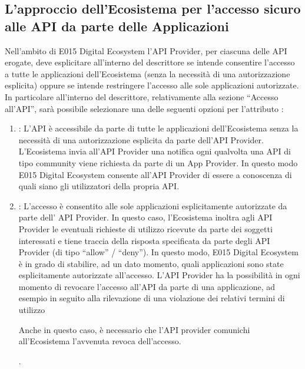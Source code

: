 \documentclass[letterpaper,10pt,italian]{sphinxmanual}
\begin{document}
\subsection{L’approccio dell’Ecosistema per l’accesso sicuro alle API da parte delle Applicazioni}
\label{\detokenize{sez22:sezione222}}\label{\detokenize{sez22:lapproccio-dellecosistema-per-laccesso-sicuro-alle-api-da-parte-delle-applicazioni}}
Nell’ambito di E015 Digital Ecosystem l’API Provider, per ciascuna delle API erogate, deve esplicitare all’interno del descrittore se intende consentire l’accesso a tutte le applicazioni dell’Ecosistema (senza la necessità di una autorizzazione esplicita) oppure se intende restringere l’accesso alle sole applicazioni autorizzate.
In particolare all’interno del descrittore, relativamente alla sezione “Accesso all’API”, sarà possibile selezionare una delle seguenti opzioni per l’attributo :
\begin{enumerate}
\item {} 
: L’API è accessibile da parte di tutte le applicazioni dell’Ecosistema senza la necessità di una autorizzazione esplicita da parte dell’API Provider. L’Ecosistema invia all’API Provider una notifica ogni qualvolta una API di tipo community viene richiesta da parte di un App Provider. In questo modo E015 Digital Ecosystem consente all’API Provider di essere a conoscenza di quali siano gli utilizzatori della propria API.

\item {} 
: L’accesso è consentito alle sole applicazioni esplicitamente autorizzate da parte dell’ API Provider. In questo caso, l’Ecosistema inoltra agli API Provider le eventuali richieste di utilizzo ricevute da parte dei soggetti interessati e tiene traccia della risposta specificata da parte degli API Provider (di tipo “allow” / “deny”). In questo modo, E015 Digital Ecosystem è in grado di stabilire, ad un dato momento, quali applicazioni sono state esplicitamente autorizzate all’accesso. L’API Provider ha la possibilità in ogni momento di revocare l’accesso all’API da parte di una applicazione, ad esempio in seguito alla rilevazione di una violazione dei relativi termini di utilizzo %
\begin{footnote}[1]\sphinxAtStartFootnote
Anche in questo caso, è necessario che l’API provider comunichi all’Ecosistema l’avvenuta revoca dell’accesso.
%
\end{footnote}.

\end{enumerate}
\end{document}
